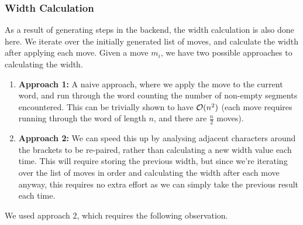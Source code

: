 \subsubsection{Width Calculation}
As a result of generating steps in the backend, the width calculation is also done here. We iterate over the initially generated list of moves, and calculate the width after applying each move. Given a move $m_{i}$, we have two possible approaches to calculating the width.
\begin{enumerate}
    \item \textbf{Approach 1:} A naive approach, where we apply the move to the current word, and run through the word counting the number of non-empty segments encountered. This can be trivially shown to have $\mathcal{O}(n^{2})$ (each move requires running through the word of length $n$, and there are $\frac{n}{2}$ moves).
    \item \textbf{Approach 2:} We can speed this up by analysing adjacent characters around the brackets to be re-paired, rather than calculating a new width value each time. This will require storing the previous width, but since we're iterating over the list of moves in order and calculating the width after each move anyway, this requires no extra effort as we can simply take the previous result each time.
\end{enumerate}
We used approach 2, which requires the following observation.

